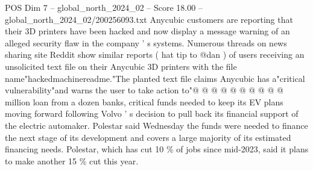\begin{textsample}{POS Dim 7 – global\_north\_2024\_02 – Score 18.00 – global\_north\_2024\_02/200256093.txt}
Anycubic customers are reporting that their 3D printers have been hacked and now display a message warning of an alleged security flaw in the company ' s systems.
Numerous threads on news sharing site Reddit show similar reports ( hat tip to @dan ) of users receiving an unsolicited text file on their Anycubic 3D printers with the file name"hackedmachinereadme."The planted text file claims Anycubic has a"critical vulnerability"and warns the user to take action to"@ @ @ @ @ @ @ @ @ @ million loan from a dozen banks, critical funds needed to keep its EV plans moving forward following Volvo ' s decision to pull back its financial support of the electric automaker.
Polestar said Wednesday the funds were needed to finance the next stage of its development and covers a large majority of its estimated financing needs.
Polestar, which has cut 10 \% of jobs since mid-2023, said it plans to make another 15 \% cut this year.

\end{textsample}
